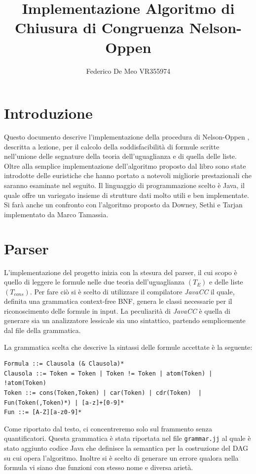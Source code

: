 \documentclass[a4paper,11pt]{article}
\title{Implementazione Algoritmo di Chiusura di Congruenza Nelson-Oppen}
\author{Federico De Meo VR355974}
\begin{document}
\maketitle

\footnotesize
\section*{Introduzione}
Questo documento descrive l'implementazione della procedura di Nelson-Oppen \cite{congruenclosure}, descritta a lezione, per il calcolo della soddisfacibilità di formule scritte nell'unione delle segnature della teoria dell'uguaglianza e di quella delle liste. Oltre alla semplice implementazione dell'algoritmo proposto dal libro sono state introdotte delle euristiche che hanno portato a notevoli migliorie prestazionali che saranno esaminate nel seguito.
Il linguaggio di programmazione scelto è Java, il quale offre un variegato insieme di strutture dati molto utili e ben implementate.
Si farà anche un confronto con l'algoritmo proposto da Downey, Sethi e Tarjan\cite{downey-sethi-tarjan-1980} implementato da Marco Tamassia.

\section{Parser}
L'implementazione del progetto inizia con la stesura del parser, il cui scopo è quello di leggere le formule nelle due teoria dell'uguaglianza $(T_E)$ e delle liste $(T_{cons})$.
Per fare ciò si è scelto di utilizzare il compilatore \emph{JavaCC} \cite{javacc} il quale, definita una grammatica context-free BNF, genera le classi necessarie per il riconoscimento delle formule in input.
La peculiarità di \emph{JavaCC} è quella di generare sia un analizzatore lessicale sia uno sintattico, partendo semplicemente dal file della grammatica.

La grammatica scelta che descrive la sintassi delle formule accettate è la seguente:
\begin{verbatim}
Formula ::= Clausola (& Clausola)*
Clausola ::= Token = Token | Token != Token | atom(Token) | !atom(Token)
Token ::= cons(Token,Token) | car(Token) | cdr(Token)  | Fun(Token(,Token)*) | [a-z]+[0-9]*
Fun ::= [A-Z][a-z0-9]*
\end{verbatim}
Come riportato dal testo, ci concentreremo solo sul frammento senza quantificatori.
Questa grammatica è stata riportata nel file {\tt grammar.jj} al quale è stato aggiunto codice Java che definisce la semantica per la costruzione del DAG su cui opera l'algoritmo.
Inoltre si è scelto di generare un errore qualora nella formula vi siano due funzioni con stesso nome e diversa arietà.
\end{document}
